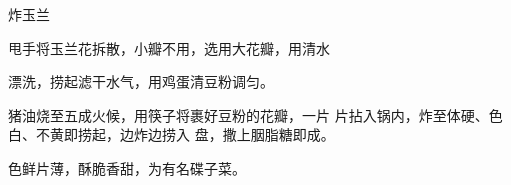 \begin{recipe}{炸玉兰}

\ingredients


\cooking

\step 甩手将玉兰花拆散，小瓣不用，选用大花瓣，用清水

漂洗，捞起滤干水气，用鸡蛋清豆粉调匀。

\step 猪油烧至五成火候，用筷子将裹好豆粉的花瓣，一片 片拈入锅内，炸至体硬、色白、不黄即捞起，边炸边捞入 盘，撒上胭脂糖即成。

\notes

色鲜片薄，酥脆香甜，为有名碟子菜。

\end{recipe}

